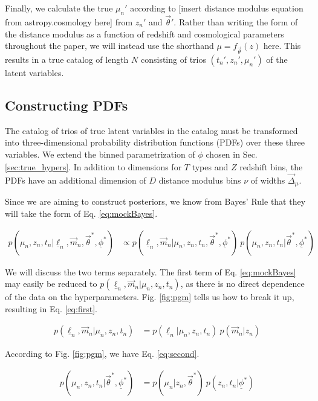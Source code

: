\documentclass[12pt, onecolumn]{emulateapj}
\newcommand{\textul}{\underline}
\begin{document}
Finally, we calculate the true $\mu_{n}'$ according to [insert distance modulus equation from astropy.cosmology here] from $z_{n}'$ and $\vec{\theta}'$.  Rather than writing the form of the distance modulus as a function of redshift and cosmological parameters throughout the paper, we will instead use the shorthand $\mu = f_{\vec{\theta}}(z)$ here.  This results in a true catalog of length $N$ consisting of trios $(t_{n}', z_{n}', \mu_{n}')$ of the latent variables.

\subsection{Constructing PDFs}
\label{sec:pdfs}

The catalog of trios of true latent variables in the catalog must be transformed into three-dimensional probability distribution functions (PDFs) over these three variables.  We extend the binned parametrization of $\textul{\phi}$ chosen in Sec. \ref{sec:true_hypers}.  In addition to dimensions for $T$ types and $Z$ redshift bins, the PDFs have an additional dimension of $D$ distance modulus bins $\nu$ of widths $\vec{\Delta}_{\mu}$.  

Since we are aiming to construct posteriors, we know from Bayes' Rule that they will take the form of Eq. \ref{eq:mockBayes}.

\begin{align}
\label{eq:mockBayes}
p(\mu_{n}, z_{n}, t_{n} | \textul{\ell}_{n}, \vec{m}_{n}, \vec{\theta}^{*}, \textul{\phi}^{*}) &\propto p(\textul{\ell}_{n}, \vec{m}_{n} | \mu_{n}, z_{n}, t_{n}, \vec{\theta}^{*}, \textul{\phi}^{*})\ p(\mu_{n}, z_{n}, t_{n} | \vec{\theta}^{*}, \textul{\phi}^{*})
\end{align}

We will discuss the two terms separately. The first term of Eq. \ref{eq:mockBayes} may easily be reduced to $p(\textul{\ell}_{n}, \vec{m}_{n} | \mu_{n}, z_{n}, t_{n})$, as there is no direct dependence of the data on the hyperparameters.  Fig. \ref{fig:pgm} tells us how to break it up, resulting in Eq. \ref{eq:first}.

\begin{align}
\label{eq:first}
p(\textul{\ell}_{n}, \vec{m}_{n} | \mu_{n}, z_{n}, t_{n}) &= p(\textul{\ell}_{n} | \mu_{n}, z_{n}, t_{n})\ p(\vec{m}_{n} | z_{n})
\end{align}

 According to Fig. \ref{fig:pgm}, we have Eq. \ref{eq:second}.

\begin{align}
\label{eq:second}
p(\mu_{n}, z_{n}, t_{n} | \vec{\theta}^{*}, \textul{\phi}^{*}) &= p(\mu_{n} | z_{n}, \vec{\theta}^{*})\ p(z_{n}, t_{n} | \textul{\phi}^{*})
\end{align}
\end{document}
